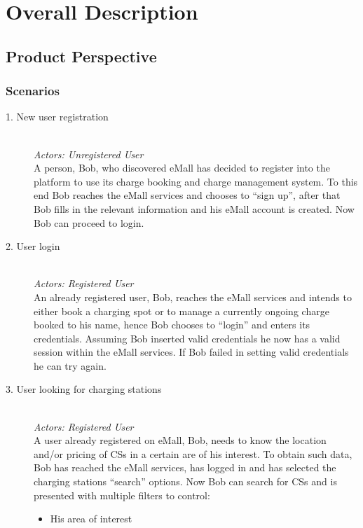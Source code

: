 \documentclass[11pt]{article}
\begin{document}
\section{Overall Description}
\label{section:overallDescription}

\subsection{Product Perspective}

\subsubsection{Scenarios}
\label{subsubsec:scenarios}

\begin{description}
    \item [1. New user registration] \hfill \\
        \textit{Actors: Unregistered User} \\
        A person, Bob, who discovered eMall has decided to register into the platform to use its charge booking and charge management system. To this end Bob reaches the eMall services and chooses to “sign up”, after that Bob fills in the relevant information and his eMall account is created. Now Bob can proceed to login.
    \item [2. User login] \hfill \\
        \textit{Actors: Registered User} \\
        An already registered user, Bob, reaches the eMall services and intends to either book a charging spot or to manage a currently ongoing charge booked to his name, hence Bob chooses to “login” and enters its credentials. Assuming Bob inserted valid credentials he now has a valid session within the eMall services. If Bob failed in setting valid credentials he can try again.
    \item [3. User looking for charging stations] \hfill \\
        \label{scenario:lookingForCS}
        \textit{Actors: Registered User} \\
        A user already registered on eMall, Bob, needs to know the location and/or pricing of CSs in a certain are of his interest. To obtain such data, Bob has reached the eMall services, has logged in and has selected the charging stations “search” options. Now Bob can search for CSs and is presented with multiple filters to control:
        \begin{itemize}
            \item His area of interest

\end{itemize}
\end{description}
\end{document}
